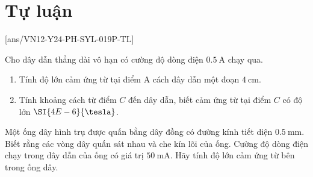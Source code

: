 \section{Tự luận}
\setcounter{ex}{0}
[ans/VN12-Y24-PH-SYL-019P-TL]
\begin{ex} 
Cho dây dẫn thẳng dài vô hạn có cường độ dòng điện $\SI{0.5}{\ampere}$ chạy qua.
\begin{enumerate}[label=\alph*)]
	\item Tính độ lớn cảm ứng từ tại điểm A cách dây dẫn một đoạn $\SI{4}{\centi\meter}$.
	\item Tính khoảng cách từ điểm $C$ đến dây dẫn, biết cảm ứng từ tại điểm $C$ có độ lớn $\SI{4E-6}{\tesla}$.	
\end{enumerate}
\end{ex}
\begin{ex}
	Một ống dây hình trụ được quấn bằng dây đồng có đường kính tiết diện $\SI{0.5}{\milli\meter}$. Biết rằng các vòng dây quấn sát nhau và che kín lõi của ống. Cường độ dòng điện chạy trong dây dẫn của ống có giá trị $\SI{50}{\milli\ampere}$. Hãy tính độ lớn cảm ứng từ bên trong ống dây.
\end{ex}
